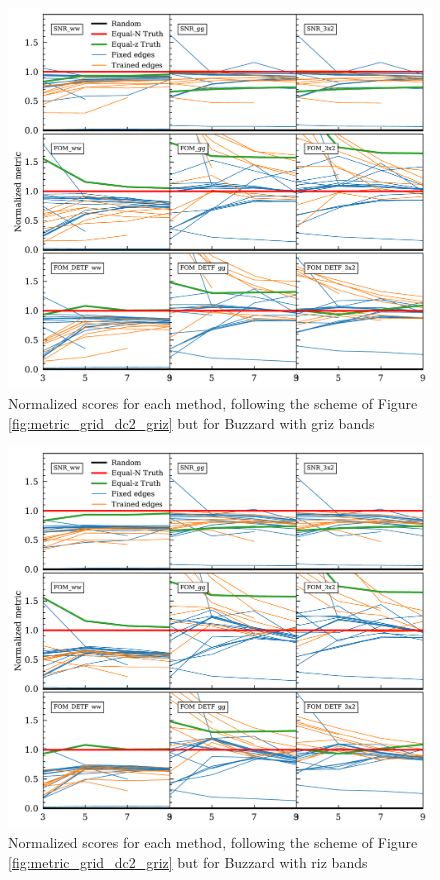 \documentclass[twocolumn,twocolappendix]{aastex63}
\begin{document}
\begin{figure}
\includegraphics[width=1\linewidth]{results/metric_grid_buzzard_griz.pdf}
\caption{Normalized scores for each method, following the scheme of Figure \ref{fig:metric_grid_dc2_griz}
but for Buzzard with griz bands}
\label{fig:metric_grid_buzzard_griz}
\end{figure}

\begin{figure}
\includegraphics[width=1\linewidth]{results/metric_grid_buzzard_riz.pdf}
\caption{Normalized scores for each method, following the scheme of Figure \ref{fig:metric_grid_dc2_griz}
but for Buzzard with riz bands}
\label{fig:metric_grid_buzzard_riz}
\end{figure}
\end{document}

